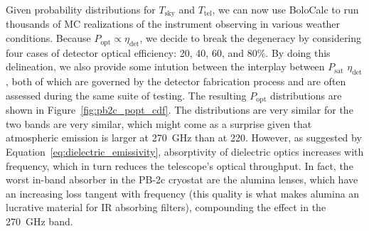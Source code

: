 Given probability distributions for $T_{\mathrm{sky}}$ and $T_{\mathrm{tel}}$, we can now use BoloCalc to run thousands of MC realizations of the instrument observing in various weather conditions. Because $P_{\mathrm{opt}} \propto \eta_{\mathrm{det}}$, we decide to break the degeneracy by considering four cases of detector optical efficiency: 20, 40, 60, and 80\%. By doing this delineation, we also provide some intution between the interplay between $P_{\mathrm{sat}}$ $\eta_{\mathrm{det}}$, both of which are governed by the detector fabrication process and are often assessed during the same suite of testing. The resulting $P_{\mathrm{opt}}$ distributions are shown in Figure~\ref{fig:pb2c_popt_cdf}. The distributions are very similar for the two bands are very similar, which might come as a surprise given that atmospheric emission is larger at 270~GHz than at 220. However, as suggested by Equation~\ref{eq:dielectric_emissivity}, absorptivity of dielectric optics increases with frequency, which in turn reduces the telescope's optical throughput. In fact, the worst in-band absorber in the PB-2c cryostat are the alumina lenses, which have an increasing loss tangent with frequency (this quality is what makes alumina an lucrative material for IR absorbing filters), compounding the effect in the 270~GHz band.

